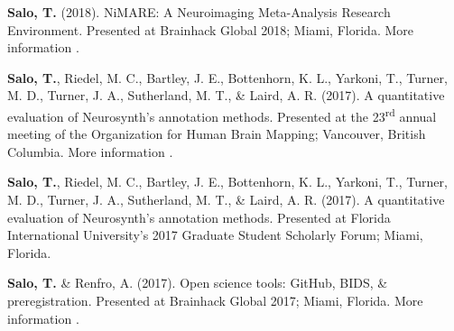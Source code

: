 \documentclass[10pt]{article}
\newcommand{\sectionstyle}{\LARGE \fontfamily{lmr}\selectfont}
\newcommand{\textlink}[3][blue]{\href{#2}{\color{#1}{#3}}}
\begin{document}
\bigskip

\begin{center}\sectionstyle{PRESENTATIONS}\end{center}

	\begin{hangparas}{.25in}{1}
	\textbf{Salo, T.} (2018).
	NiMARE: A Neuroimaging Meta-Analysis Research Environment.
	Presented at Brainhack Global 2018; Miami, Florida. More
	information \textlink{https://www.slideshare.net/TaylorSalo/nimarebrainhackglobalmiami}{here}.

	\bigskip

	\textbf{Salo, T.}, Riedel, M. C., Bartley, J. E., Bottenhorn, K. L., Yarkoni, T.,
	Turner, M. D., Turner, J. A., Sutherland, M. T., \& Laird, A. R. (2017).
	A quantitative evaluation of Neurosynth's annotation methods. Presented at
	the 23\textsuperscript{rd} annual meeting of the Organization for Human Brain
	Mapping; Vancouver, British Columbia. More information
	\textlink{https://nbclab.github.io/presentations/salo-neurosynth-presentation}{here}.

	\bigskip

	\textbf{Salo, T.}, Riedel, M. C., Bartley, J. E., Bottenhorn, K. L., Yarkoni, T.,
	Turner, M. D., Turner, J. A., Sutherland, M. T., \& Laird, A. R. (2017).
	A quantitative evaluation of Neurosynth's annotation methods. Presented at
	Florida International University's 2017 Graduate Student Scholarly Forum;
	Miami, Florida.

	\bigskip

	\textbf{Salo, T.} \& Renfro, A. (2017). Open science tools: GitHub, BIDS, \&
	preregistration. Presented at Brainhack Global 2017; Miami, Florida. More
	information \textlink{https://osf.io/557vf}{here}.

\end{hangparas}

\bigskip

\begin{center}\sectionstyle{POSTERS}\end{center}
\end{document}
